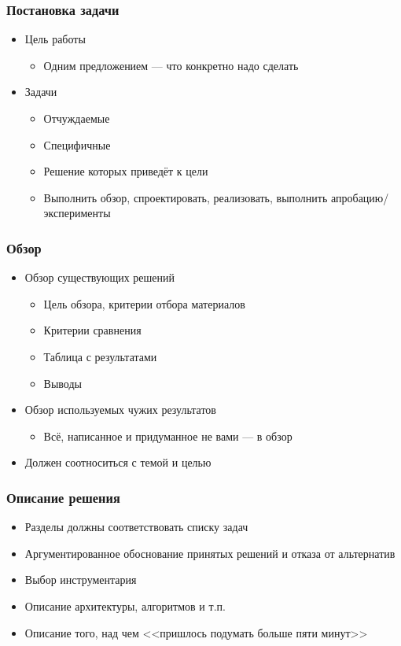\documentclass[xetex,mathserif,serif]{beamer}
\begin{document}
    \begin{frame}
        \frametitle{Постановка задачи}
        \begin{itemize}
            \item Цель работы
            \begin{itemize}
                \item Одним предложением --- что конкретно надо сделать
            \end{itemize}
            \item Задачи
            \begin{itemize}
                \item Отчуждаемые
                \item Специфичные
                \item Решение которых приведёт к цели
                \item Выполнить обзор, спроектировать, реализовать, выполнить апробацию/эксперименты
            \end{itemize}
        \end{itemize}
    \end{frame}

    \begin{frame}
        \frametitle{Обзор}
        \begin{itemize}
            \item Обзор существующих решений
            \begin{itemize}
                \item Цель обзора, критерии отбора материалов
                \item Критерии сравнения
                \item Таблица с результатами
                \item Выводы
            \end{itemize}
            \item Обзор используемых чужих результатов
            \begin{itemize}
                \item Всё, написанное и придуманное не вами --- в обзор
            \end{itemize}
            \item Должен соотноситься с темой и целью
        \end{itemize}
    \end{frame}

    \begin{frame}
        \frametitle{Описание решения}
        \begin{itemize}
            \item Разделы должны соответствовать списку задач
            \item Аргументированное обоснование принятых решений и отказа от альтернатив
            \item Выбор инструментария
            \item Описание архитектуры, алгоритмов и т.п.
            \item Описание того, над чем <<пришлось подумать больше пяти минут>>
        \end{itemize}
    \end{frame}
\end{document}
